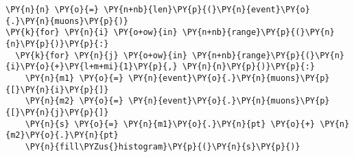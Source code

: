 \begin{Verbatim}[commandchars=\\\{\}]
\PY{n}{n} \PY{o}{=} \PY{n+nb}{len}\PY{p}{(}\PY{n}{event}\PY{o}{.}\PY{n}{muons}\PY{p}{)}
\PY{k}{for} \PY{n}{i} \PY{o+ow}{in} \PY{n+nb}{range}\PY{p}{(}\PY{n}{n}\PY{p}{)}\PY{p}{:}
  \PY{k}{for} \PY{n}{j} \PY{o+ow}{in} \PY{n+nb}{range}\PY{p}{(}\PY{n}{i}\PY{o}{+}\PY{l+m+mi}{1}\PY{p}{,} \PY{n}{n}\PY{p}{)}\PY{p}{:}
    \PY{n}{m1} \PY{o}{=} \PY{n}{event}\PY{o}{.}\PY{n}{muons}\PY{p}{[}\PY{n}{i}\PY{p}{]}
    \PY{n}{m2} \PY{o}{=} \PY{n}{event}\PY{o}{.}\PY{n}{muons}\PY{p}{[}\PY{n}{j}\PY{p}{]}
    \PY{n}{s} \PY{o}{=} \PY{n}{m1}\PY{o}{.}\PY{n}{pt} \PY{o}{+} \PY{n}{m2}\PY{o}{.}\PY{n}{pt}
    \PY{n}{fill\PYZus{}histogram}\PY{p}{(}\PY{n}{s}\PY{p}{)}
\end{Verbatim}
